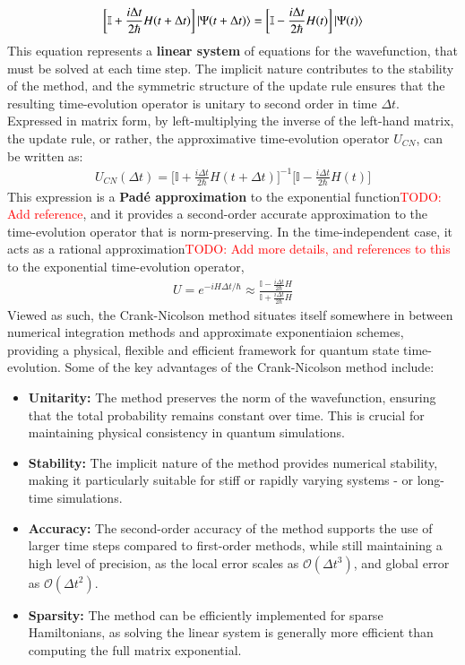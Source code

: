 \documentclass{subfiles}
\begin{document}
\begin{align*}
    \bigg[\mathbb{I} + \frac{i\Delta t}{2\hbar}H(t + \Delta t)\bigg]\ket{\Psi(t + \Delta t)} = \bigg[\mathbb{I} - \frac{i\Delta t}{2\hbar}H(t)\bigg]\ket{\Psi(t)}
\end{align*}
This equation represents a \textbf{linear system} of equations for the wavefunction, that must be solved at each time step. The implicit nature contributes to the stability of the method, and the symmetric structure of the update rule ensures that the resulting time-evolution operator is unitary to second order in time $\Delta t$. Expressed in matrix form, by left-multiplying the inverse of the left-hand matrix, the update rule, or rather, the approximative time-evolution operator $U_{CN}$, can be written as:
\begin{align*}
    U_{CN} (\Delta t) = \bigg[\mathbb{I} + \frac{i\Delta t}{2\hbar}H(t + \Delta t)\bigg]^{-1}\bigg[\mathbb{I} - \frac{i\Delta t}{2\hbar}H(t)\bigg]
\end{align*}
This expression is a \textbf{Padé approximation} to the exponential function\textcolor{red}{TODO: Add reference}, and it provides a second-order accurate approximation to the time-evolution operator that is norm-preserving. In the time-independent case, it acts as a rational approximation\textcolor{red}{TODO: Add more details, and references to this} to the exponential time-evolution operator,
\begin{align*}
    U = e^{-iH\Delta t/\hbar} \approx \frac{\mathbb{I} - \frac{i\Delta t}{2\hbar}H}{\mathbb{I} + \frac{i\Delta t}{2\hbar}H}
\end{align*}
Viewed as such, the Crank-Nicolson method situates itself somewhere in between numerical integration methods and approximate exponentiaion schemes, providing a physical, flexible and efficient framework for quantum state time-evolution. Some of the key advantages of the Crank-Nicolson method include:
\begin{itemize}
    \item \textbf{Unitarity:} The method preserves the norm of the wavefunction, ensuring that the total probability remains constant over time. This is crucial for maintaining physical consistency in quantum simulations.
    \item \textbf{Stability:} The implicit nature of the method provides numerical stability, making it particularly suitable for stiff or rapidly varying systems - or long-time simulations.
    \item \textbf{Accuracy:} The second-order accuracy of the method supports the use of larger time steps compared to first-order methods, while still maintaining a high level of precision, as the local error scales as $\mathcal{O}(\Delta t^3)$, and global error as $\mathcal{O}(\Delta t^2)$.
    \item \textbf{Sparsity:} The method can be efficiently implemented for sparse Hamiltonians, as solving the linear system is generally more efficient than computing the full matrix exponential.
\end{itemize}
\end{document}
